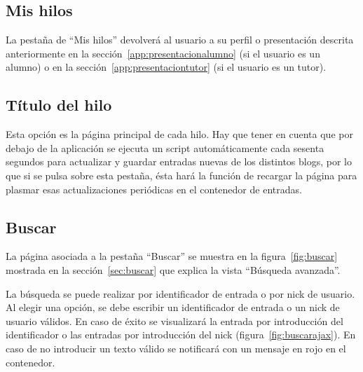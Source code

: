 \documentclass[a4paper, 12pt]{book}
\begin{document}
\subsection{Mis hilos}
La pesta\~na de ``Mis hilos'' devolver\'a al usuario a su perfil o presentaci\'on descrita anteriormente en la secci\'on~\ref{app:presentacionalumno} (si el usuario
es un alumno) o en la secci\'on~\ref{app:presentaciontutor} (si el usuario es un tutor).

\subsection{T\'itulo del hilo}
Esta opci\'on es la p\'agina principal de cada hilo. Hay que tener en cuenta que por debajo de la aplicaci\'on se ejecuta un script autom\'aticamente cada 
sesenta segundos para actualizar y guardar entradas nuevas de los distintos blogs, por lo que si se pulsa sobre esta pesta\~na, \'esta har\'a la funci\'on 
de recargar la p\'agina para plasmar esas actualizaciones peri\'odicas en el contenedor de entradas.

\subsection{Buscar}
La p\'agina asociada a la pesta\~na ``Buscar'' se muestra en la figura~\ref{fig:buscar} mostrada en la secci\'on~\ref{sec:buscar} que explica la 
vista ``B\'usqueda avanzada''.

La b\'usqueda se puede realizar por identificador de entrada o por nick de usuario. Al elegir una opci\'on, se debe escribir un identificador de entrada o 
un nick de usuario v\'alidos. En caso de \'exito se visualizar\'a la entrada por introducci\'on del identificador o las entradas por introducci\'on del nick
(figura~\ref{fig:buscarajax}). En caso de no introducir un texto v\'alido se notificar\'a con un mensaje en rojo en el contenedor.
\end{document}
